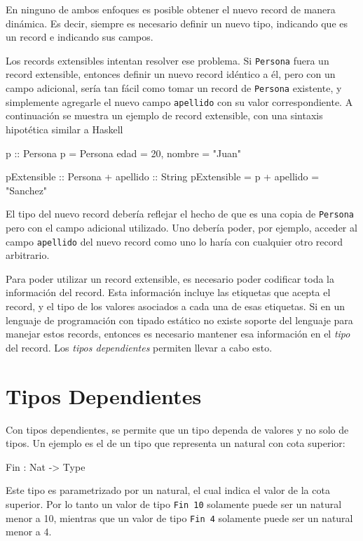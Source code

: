 En ninguno de ambos enfoques es posible obtener el nuevo record de manera dinámica. Es decir, siempre es necesario definir un nuevo tipo, indicando que es un record e indicando sus campos.

Los records extensibles intentan resolver ese problema. Si \texttt{Persona} fuera un record extensible, entonces definir un nuevo record idéntico a él, pero con un campo adicional, sería tan fácil como tomar un record de \texttt{Persona} existente, y simplemente agregarle el nuevo campo \texttt{apellido} con su valor correspondiente. A continuación se muestra un ejemplo de record extensible, con una sintaxis hipotética similar a Haskell

\begin{code}
p :: Persona
p = Persona {edad = 20, nombre = "Juan"}

pExtensible :: Persona + {apellido :: String}
pExtensible = p + {apellido = "Sanchez"}
\end{code}

El tipo del nuevo record debería reflejar el hecho de que es una copia de \texttt{Persona} pero con el campo adicional utilizado. Uno debería poder, por ejemplo, acceder al campo \texttt{apellido} del nuevo record como uno lo haría con cualquier otro record arbitrario.

Para poder utilizar un record extensible, es necesario poder codificar toda la información del record. Esta información incluye las etiquetas que acepta el record, y el tipo de los valores asociados a cada una de esas etiquetas. Si en un lenguaje de programación con tipado estático no existe soporte del lenguaje para manejar estos records, entonces es necesario mantener esa información en el \textit{tipo} del record. Los \textit{tipos dependientes} permiten llevar a cabo esto.

\section{Tipos Dependientes}

Con tipos dependientes, se permite que un tipo dependa de valores y no solo de tipos. Un ejemplo es el de un tipo que representa un natural con cota superior:
\begin{code}
Fin : Nat -> Type
\end{code}
Este tipo es parametrizado por un natural, el cual indica el valor de la cota superior. Por lo tanto un valor de tipo \texttt{Fin 10} solamente puede ser un natural menor a 10, mientras que un valor de tipo \texttt{Fin 4} solamente puede ser un natural menor a 4.

